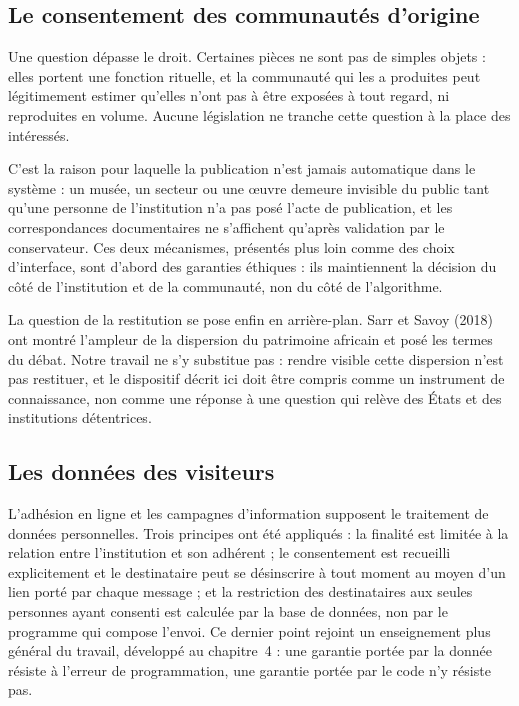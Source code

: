 \subsection{Le consentement des communautés d'origine}

Une question dépasse le droit. Certaines pièces ne sont pas de simples objets :
elles portent une fonction rituelle, et la communauté qui les a produites peut
légitimement estimer qu'elles n'ont pas à être exposées à tout regard, ni
reproduites en volume. Aucune législation ne tranche cette question à la place
des intéressés.

C'est la raison pour laquelle la publication n'est jamais automatique dans le
système : un musée, un secteur ou une œuvre demeure invisible du public tant
qu'une personne de l'institution n'a pas posé l'acte de publication, et les
correspondances documentaires ne s'affichent qu'après validation par le
conservateur. Ces deux mécanismes, présentés plus loin comme des choix
d'interface, sont d'abord des garanties éthiques : ils maintiennent la décision
du côté de l'institution et de la communauté, non du côté de l'algorithme.

La question de la restitution se pose enfin en arrière-plan. Sarr et Savoy
(2018) ont montré l'ampleur de la dispersion du patrimoine africain et posé les
termes du débat. Notre travail ne s'y substitue pas : rendre visible cette
dispersion n'est pas restituer, et le dispositif décrit ici doit être compris
comme un instrument de connaissance, non comme une réponse à une question qui
relève des États et des institutions détentrices.

\subsection{Les données des visiteurs}

L'adhésion en ligne et les campagnes d'information supposent le traitement de
données personnelles. Trois principes ont été appliqués : la finalité est
limitée à la relation entre l'institution et son adhérent ; le consentement est
recueilli explicitement et le destinataire peut se désinscrire à tout moment au
moyen d'un lien porté par chaque message ; et la restriction des destinataires
aux seules personnes ayant consenti est calculée par la base de données, non
par le programme qui compose l'envoi. Ce dernier point rejoint un enseignement
plus général du travail, développé au chapitre~4 : une garantie portée par la
donnée résiste à l'erreur de programmation, une garantie portée par le code n'y
résiste pas.



